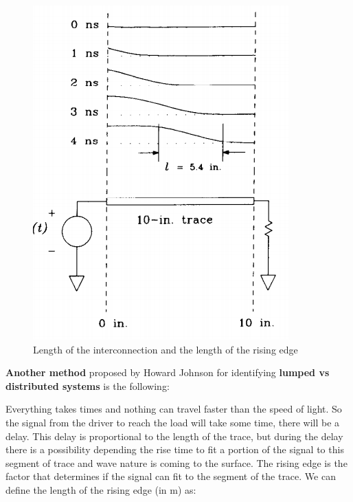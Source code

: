 \documentclass[final]{cubedoc}
\begin{document}
	\begin{figure}[h!]
		\centering
		\includegraphics[height = .3\textheight, keepaspectratio, width = \textwidth]{assets/rising_edge_length.png}
		\caption{Length of the interconnection and the length of the rising edge \cite[p.8]{johnson2003high}}
	\end{figure}
	
	\textbf{Another method} proposed by Howard Johnson for identifying \textbf{lumped vs distributed systems} is the following:
	
	Everything takes times and nothing can travel faster than the speed of light. So the signal from the driver to reach the load will take some time, there will be a delay. This delay is proportional to the length of the trace, but during the delay there is a possibility depending the rise time to fit a portion of the signal to this segment of trace and wave nature is coming to the surface. The rising edge is the factor that determines if the signal can fit to the segment of the trace. We can define the length of the rising edge (in m) as:
	
\end{document}
